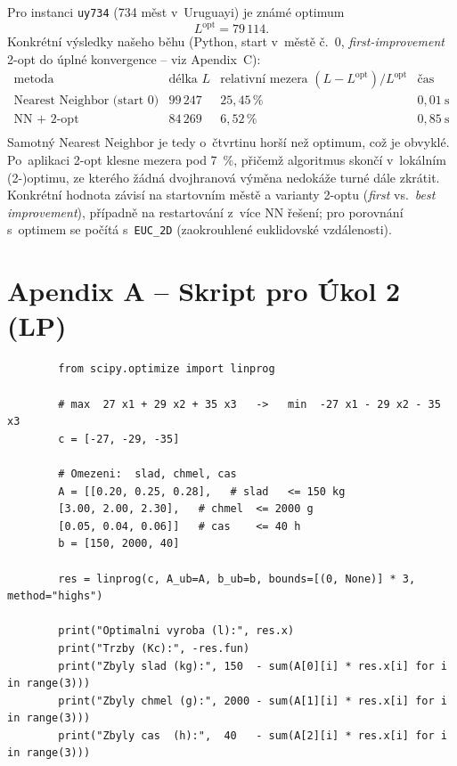 \documentclass[11pt,a4paper]{article}
\begin{document}
	Pro instanci \texttt{uy734} (734 měst v~Uruguayi) je známé optimum
	\[
	L^{\text{opt}} = 79\,114.
	\]
	Konkrétní výsledky našeho běhu (Python, start v~městě č.~0, \emph{first-improvement} 2-opt do úplné konvergence -- viz Apendix~C):
	\[
	\begin{array}{lccr}
		\text{metoda} & \text{délka } L & \text{relativní mezera } (L-L^{\text{opt}})/L^{\text{opt}} & \text{čas}\\\hline
		\text{Nearest Neighbor (start 0)} & 99\,247 & 25{,}45\,\% & 0{,}01~\text{s}\\
		\text{NN + 2-opt}                 & 84\,269 & 6{,}52\,\% & 0{,}85~\text{s}\\
	\end{array}
	\]
	Samotný Nearest Neighbor je tedy o~čtvrtinu horší než optimum, což je obvyklé. Po~aplikaci 2-opt klesne mezera pod 7~\%, přičemž algoritmus skončí v~lokálním (2-)optimu, ze kterého žádná dvojhranová výměna nedokáže turné dále zkrátit. Konkrétní hodnota závisí na startovním městě a varianty 2-optu (\emph{first} vs.\ \emph{best improvement}), případně na restartování z~více NN řešení; pro porovnání s~optimem se počítá s~\texttt{EUC\_2D} (zaokrouhlené euklidovské vzdálenosti).
	
	\appendix
	\section*{Apendix A -- Skript pro Úkol 2 (LP)}
	\begin{lstlisting}
		from scipy.optimize import linprog
		
		# max  27 x1 + 29 x2 + 35 x3   ->   min  -27 x1 - 29 x2 - 35 x3
		c = [-27, -29, -35]
		
		# Omezeni:  slad, chmel, cas
		A = [[0.20, 0.25, 0.28],   # slad   <= 150 kg
		[3.00, 2.00, 2.30],   # chmel  <= 2000 g
		[0.05, 0.04, 0.06]]   # cas    <= 40 h
		b = [150, 2000, 40]
		
		res = linprog(c, A_ub=A, b_ub=b, bounds=[(0, None)] * 3, method="highs")
		
		print("Optimalni vyroba (l):", res.x)
		print("Trzby (Kc):", -res.fun)
		print("Zbyly slad (kg):", 150  - sum(A[0][i] * res.x[i] for i in range(3)))
		print("Zbyly chmel (g):", 2000 - sum(A[1][i] * res.x[i] for i in range(3)))
		print("Zbyly cas  (h):",  40   - sum(A[2][i] * res.x[i] for i in range(3)))
	\end{lstlisting}
	
\end{document}
